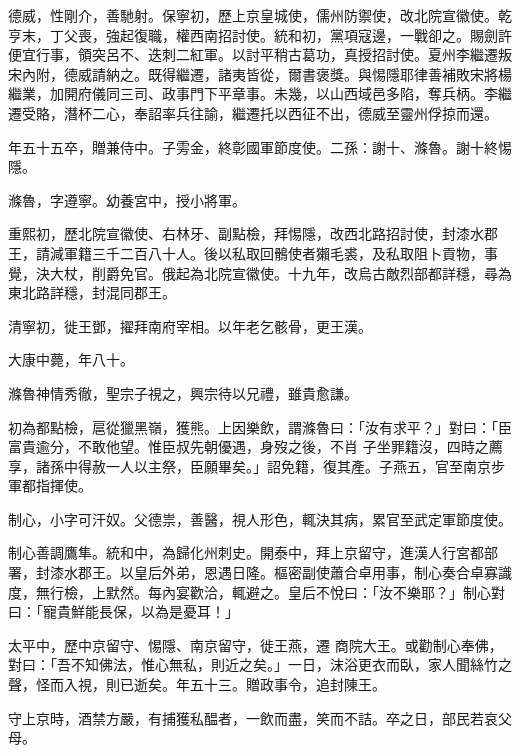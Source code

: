 \begin{pinyinscope}
 德威，性剛介，善馳射。保寧初，歷上京皇城使，儒州防禦使，改北院宣徽使。乾亨末，丁父喪，強起復職，權西南招討使。統和初，黨項寇邊，一戰卻之。賜劍許便宜行事，領突呂不、迭刺二紅軍。以討平稍古葛功，真授招討使。夏州李繼遷叛宋內附，德威請納之。既得繼遷，諸夷皆從，爾書褒獎。與惕隱耶律善補敗宋將楊繼業，加開府儀同三司、政事門下平章事。未幾，以山西域邑多陷，奪兵柄。李繼遷受賂，潛杯二心，奉詔率兵往諭，繼遷托以西征不出，德威至靈州俘掠而還。



 年五十五卒，贈兼侍中。子雱金，終彰國軍節度使。二孫：謝十、滌魯。謝十終惕隱。



 滌魯，字遵寧。幼養宮中，授小將軍。



 重熙初，歷北院宣徽使、右林牙、副點檢，拜惕隱，改西北路招討使，封漆水郡王，請減軍籍三千二百八十人。後以私取回鶻使者獺毛裘，及私取阻卜貢物，事覺，決大杖，削爵免官。俄起為北院宣徽使。十九年，改烏古敵烈部都詳穩，尋為東北路詳穩，封混同郡王。



 清寧初，徙王鄧，擢拜南府宰相。以年老乞骸骨，更王漢。



 大康中薨，年八十。



 滌魯神情秀徹，聖宗子視之，興宗待以兄禮，雖貴愈謙。



 初為都點檢，扈從獵黑嶺，獲熊。上因樂飲，謂滌魯曰：「汝有求平？」對曰：「臣富貴逾分，不敢他望。惟臣叔先朝優遇，身歿之後，不肖
 子坐罪籍沒，四時之薦享，諸孫中得赦一人以主祭，臣願畢矣。」詔免籍，復其產。子燕五，官至南京步軍都指揮使。



 制心，小字可汗奴。父德祟，善醫，視人形色，輒決其病，累官至武定軍節度使。



 制心善調鷹隼。統和中，為歸化州刺史。開泰中，拜上京留守，進漢人行宮都部署，封漆水郡王。以皇后外弟，恩遇日隆。樞密副使蕭合卓用事，制心奏合卓寡識度，無行檢，上默然。每內宴歡洽，輒避之。皇后不悅曰：「汝不樂耶？」制心對曰：「寵貴鮮能長保，以為是憂耳！」



 太平中，歷中京留守、惕隱、南京留守，徙王燕，遷
 商院大王。或勸制心奉佛，對曰：「吾不知佛法，惟心無私，則近之矣。」一日，沫浴更衣而臥，家人聞絲竹之聲，怪而入視，則已逝矣。年五十三。贈政事令，追封陳王。



 守上京時，酒禁方嚴，有捕獲私醖者，一飲而盡，笑而不詰。卒之日，部民若哀父母。




\end{pinyinscope}
